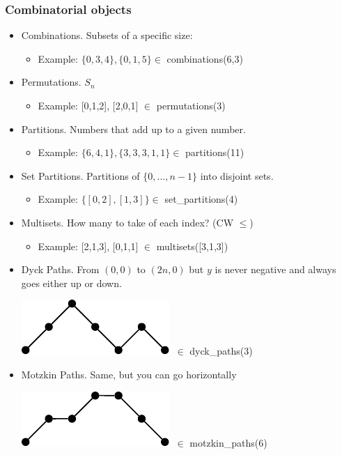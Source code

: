 \documentclass[spanish,professionalfonts]{beamer}
\def\tcb#1{\textcolor{MyBlue}{#1}}
\begin{document}
\begin{frame}\frametitle{Combinatorial objects}
  \begin{itemize}
    \item \tcb{Combinations}. Subsets of a specific size:
    \begin{itemize}
      \item  Example: $\{0,3,4\}, \{0,1,5\}\in$ combinations(6,3) \pause
    \end{itemize}
    \item \tcb{Permutations}. $S_n$
    \begin{itemize}
        \item  Example: [0,1,2], [2,0,1] $\in$ permutations(3) \pause
    \end{itemize}
    \item \tcb{Partitions}. Numbers that add up to a given number.
    \begin{itemize}
        \item  Example: $\{6,4,1\}, \{3,3,3,1,1\} \in$ partitions(11) \pause
    \end{itemize}
    \item \tcb{Set Partitions}. Partitions of $\{0,...,n-1\}$ into disjoint sets.
	\begin{itemize}
        \item  Example: $\{[0,2], [1,3]\} \in$ set\_partitions(4) \pause
    \end{itemize}
    \item \tcb{Multisets}. How many to take of each index? (CW $\leq$)
    \begin{itemize}
        \item  Example: [2,1,3], [0,1,1] $\in$ multisets([3,1,3]) \pause
    \end{itemize}
    \item \tcb{Dyck Paths}. From $(0,0)$ to $(2n,0)$ but $y$ is never negative and always goes either up or down.
    \begin{center}
      \includegraphics[scale=0.6]{./dyck.pdf} $\ \in$ dyck\_paths(3)
    \end{center} \pause

    \item \tcb{Motzkin Paths}. Same, but you can go horizontally
    \begin{center}
      \includegraphics[scale=0.6]{./motzkin.pdf} $\ \in$ motzkin\_paths(6) 
    \end{center}

  \end{itemize}
\end{frame}
\end{document}
